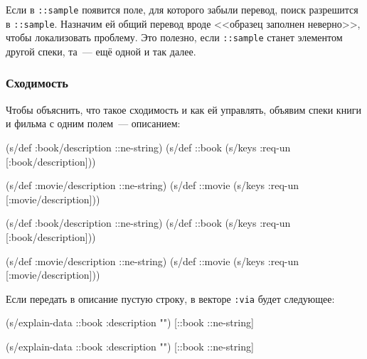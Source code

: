 \fi

Если в \verb|::sample| появится поле, для которого забыли перевод, поиск
разрешится в \verb|::sample|. Назначим ей общий перевод вроде <<образец
заполнен неверно>>, чтобы локализовать проблему. Это полезно, если
\verb|::sample| станет элементом другой спеки, та~--- ещё одной и так далее.

\subsubsection{Сходимость}

Чтобы объяснить, что такое сходимость и как ей управлять, объявим спеки книги и
фильма с одним полем~--- описанием:

\ifx\DEVICETYPE\MOBILE

\begin{english}
  \begin{clojure}
(s/def :book/description ::ne-string)
(s/def ::book
  (s/keys :req-un [:book/description]))

(s/def :movie/description ::ne-string)
(s/def ::movie
  (s/keys :req-un [:movie/description]))
  \end{clojure}
\end{english}

\else

\begin{english}
  \begin{clojure}
(s/def :book/description ::ne-string)
(s/def ::book (s/keys :req-un [:book/description]))

(s/def :movie/description ::ne-string)
(s/def ::movie (s/keys :req-un [:movie/description]))
  \end{clojure}
\end{english}

\fi

Если передать в описание пустую строку, в векторе \verb|:via| будет следующее:

\ifx\DEVICETYPE\MOBILE

\begin{english}
  \begin{clojure}
(s/explain-data ::book
  {:description ""})
[::book ::ne-string]
  \end{clojure}
\end{english}

\else

\begin{english}
  \begin{clojure}
(s/explain-data ::book {:description ""})
[::book ::ne-string]
  \end{clojure}
\end{english}

